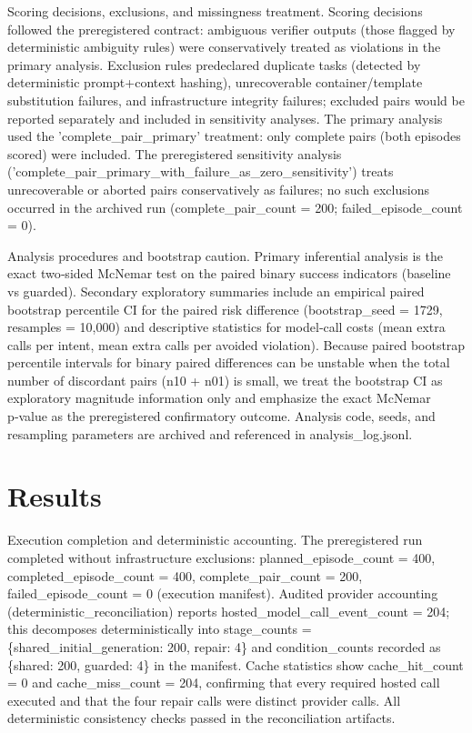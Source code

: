 \documentclass[conference]{IEEEtran}
\begin{document}
Scoring decisions, exclusions, and missingness treatment. Scoring decisions followed the preregistered contract: ambiguous verifier outputs (those flagged by deterministic ambiguity rules) were conservatively treated as violations in the primary analysis. Exclusion rules predeclared duplicate tasks (detected by deterministic prompt+context hashing), unrecoverable container/template substitution failures, and infrastructure integrity failures; excluded pairs would be reported separately and included in sensitivity analyses. The primary analysis used the 'complete\_pair\_primary' treatment: only complete pairs (both episodes scored) were included. The preregistered sensitivity analysis ('complete\_pair\_primary\_with\_failure\_as\_zero\_sensitivity') treats unrecoverable or aborted pairs conservatively as failures; no such exclusions occurred in the archived run (complete\_pair\_count = 200; failed\_episode\_count = 0).

Analysis procedures and bootstrap caution. Primary inferential analysis is the exact two‑sided McNemar test on the paired binary success indicators (baseline vs guarded). Secondary exploratory summaries include an empirical paired bootstrap percentile CI for the paired risk difference (bootstrap\_seed = 1729, resamples = 10,000) and descriptive statistics for model‑call costs (mean extra calls per intent, mean extra calls per avoided violation). Because paired bootstrap percentile intervals for binary paired differences can be unstable when the total number of discordant pairs (n10 + n01) is small, we treat the bootstrap CI as exploratory magnitude information only and emphasize the exact McNemar p‑value as the preregistered confirmatory outcome. Analysis code, seeds, and resampling parameters are archived and referenced in analysis\_log.jsonl.

\section{Results}
Execution completion and deterministic accounting. The preregistered run completed without infrastructure exclusions: planned\_episode\_count = 400, completed\_episode\_count = 400, complete\_pair\_count = 200, failed\_episode\_count = 0 (execution manifest). Audited provider accounting (deterministic\_reconciliation) reports hosted\_model\_call\_event\_count = 204; this decomposes deterministically into stage\_counts = \{shared\_initial\_generation: 200, repair: 4\} and condition\_counts recorded as \{shared: 200, guarded: 4\} in the manifest. Cache statistics show cache\_hit\_count = 0 and cache\_miss\_count = 204, confirming that every required hosted call executed and that the four repair calls were distinct provider calls. All deterministic consistency checks passed in the reconciliation artifacts.
\end{document}
